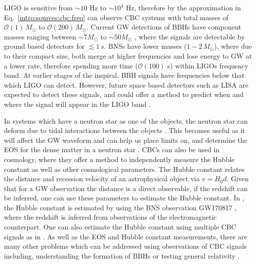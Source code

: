 \gls{LIGO} is sensitive from $\sim 10$ Hz to $\sim 10^4$ Hz, therefore by the
approximation in Eq.~\ref{intro:sources:cbc:freq} can observe \gls{CBC} systems with total masses of $\mathcal{O}(1)\,M_{\odot}$ to
$\mathcal{O}(200)\, M_{\odot}$. Current \gls{GW} detections of \glspl{BBH} have component masses ranging between $\sim 7M_{\odot}$ to $\sim
50M_{\odot}$
\citep{ligoscientificcollaborationandvirgocollaboration2019GWTC1GravitationalWave},
where the signals are detectable by ground based detectors for $\lesssim 1\,s$.
\glspl{BNS} have lower masses ($1-2\,M_{\odot}$), where due to their compact
size, both merge at higher frequencies and lose energy to \gls{GW} at a lower
rate, therefore spending more time ($\mathcal{O}(100)$ s) within \glspl{LIGO}
frequency band.  At earlier stages of the inspiral, \gls{BBH} signals have
frequencies below that which \gls{LIGO} can detect.  However, future space
based detectors such as \gls{LISA} \citep{danzmann1996LISALaser} are expected to
detect these signals, and could offer a method to predict when and where the
signal will appear in the \gls{LIGO} band \citep{sesana2016ProspectsMultiband}. 

In systems which have a neutron star as one of the objects, the neutron star
can deform due to tidal interactions between the objects
\citep{flanagan2008ConstrainingNeutronstar}.  This becomes useful as it will
affect the \gls{GW} waveform and can help us place limits on, and determine the
\gls{EOS} for the dense matter in a neutron star
\citep{harry2018ObservingMeasuring}.  \glspl{CBC} can also be used in
cosmology, where they offer a method to independently measure the Hubble
constant as well as other cosmological parameters.  The Hubble constant relates
the distance and recession velocity of an astrophysical object via $v = H_0 d$.
Given that for a \gls{GW} observation the distance is a direct observable, if
the redshift can be inferred, one can use these parameters to estimate the
Hubble constant.  In
\cite{theligoscientificcollaborationandthevirgocollaboration2017GravitationalwaveStandard},
the Hubble constant is estimated by using the \gls{BNS} observation GW170817
\citep{abbott2017GW170817Observation}, where the redshift is inferred from
observations of the electromagnetic counterpart.  One can also estimate the Hubble constant using multiple \gls{CBC} signals as in \citep{delpozzo2012InferenceCosmological}.  As well as the \gls{EOS} and Hubble constant measurements, there are many other problems which can be addressed using observations of \gls{CBC} signals including, understanding the formation of \glspl{BBH}
\citep{zevin2017ConstrainingFormation,mandel2018MergingStellarmass} or testing
general relativity
\citep{theligoscientificcollaborationandthevirgocollaboration2019TestsGeneral}. 

